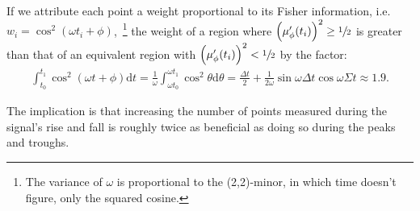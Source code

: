 \documentclass{article}
\newcommand{\td}{\mathrm{d}}
\begin{document}
If we attribute each point a weight proportional to its Fisher information, i.e. $w_i = \cos^2(\omega t_i + \phi)$,~\footnote{The variance of $\omega$ is proportional to the (2,2)-minor, in which time doesn't figure, only the squared cosine.} the weight of a region where $\bkt{\mupp}^2 \geq\sfrac12$ is greater than that of an equivalent region with $\bkt{\mupp}^2 < \sfrac12$  by the factor:
\begin{align*}
	\int_{t_0}^{t_1}\cos^2(\omega t + \phi)\td t = \frac1\omega\int_{\omega t_0}^{\omega t_1} \cos^2\theta\td\theta = \frac{\Delta t}{2} + \frac{1}{2\omega}\sin\omega\Delta t\cos\omega\Sigma t \approx 1.9.
\end{align*}

The implication is that increasing the number of points measured during the signal's rise and fall is roughly twice as beneficial as doing so during the peaks and troughs.

%
%
\end{document}
